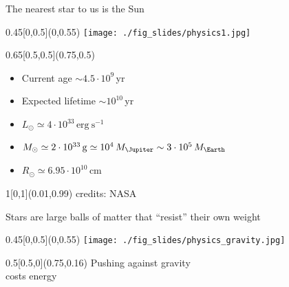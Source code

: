 \documentclass[xcolor=dvipsnames,professionalfonts, aspectratio=169]{beamer}
\begin{document}
\bgroup
{}
\begin{frame}{\color{whiteish} The nearest star to us is the Sun}
  \begin{textblock}{0.45}[0,0.5](0,0.55)
    \texttt{[image: ./fig\_slides/physics1.jpg]}
  \end{textblock}

  \begin{textblock}{0.65}[0.5,0.5](0.75,0.5)
    \begin{itemize}
      \Large
    \item[\color{red}\textbullet] \textcolor{whiteish}{Current age $\sim 4.5\cdot 10^9$\,yr}
    \item[\color{red}\textbullet] \textcolor{whiteish}{Expected lifetime $\sim 10^{10}$\,yr}
    \item[\color{red}\textbullet]
      \textcolor{whiteish}{$L_\odot\simeq 4\cdot 10^{33}\,\mathrm{erg\ s^{-1}}$}
    \item[\color{red}\textbullet]
     \textcolor{whiteish}{$M_\odot\simeq 2\cdot 10^{33}\,\mathrm{g}\simeq 10^4\,M_\Jupiter \sim3\cdot 10^5\,M_\Earth$}

    \item[\color{red}\textbullet] \textcolor{whiteish}{$R_\odot \simeq 6.95\cdot 10^{10}$\,cm}
    \end{itemize}
  \end{textblock}


  \begin{textblock}{1}[0,1](0.01,0.99)
    \textcolor{gray!50}{\tiny credits: NASA}
  \end{textblock}
\end{frame}



\begin{frame}{\textcolor{whiteish}{Stars are large balls of matter that ``resist'' their own weight}}

    \begin{textblock}{0.45}[0,0.5](0,0.55)
      \texttt{[image: ./fig\_slides/physics\_gravity.jpg]}
    \end{textblock}

  \begin{textblock}{0.5}[0.5,0](0.75,0.16)
    \centering
    \textcolor{whiteish}{
      Pushing against gravity \\
      costs energy}
  \end{textblock}

\end{frame}
\end{document}

